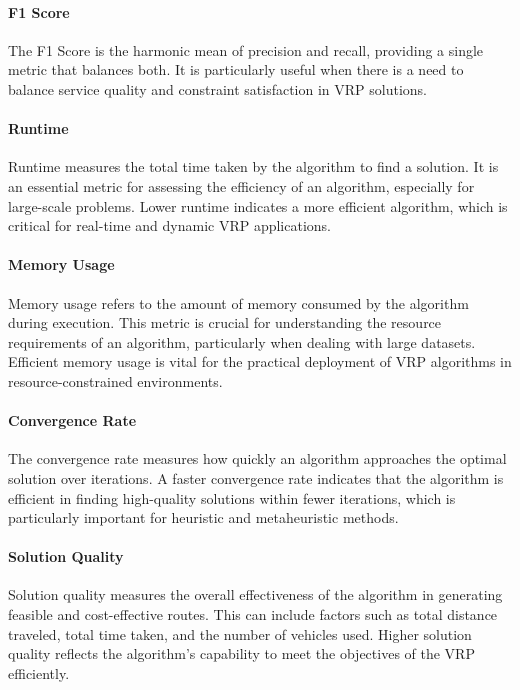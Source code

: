 \documentclass[
]{article}
\begin{document}
  \paragraph{F1 Score} The F1 Score is the harmonic mean of precision and recall, providing a single metric that balances both. It is particularly useful when there is a need to balance service quality and constraint satisfaction in VRP solutions.
  
  \paragraph{Runtime} Runtime measures the total time taken by the algorithm to find a solution. It is an essential metric for assessing the efficiency of an algorithm, especially for large-scale problems. Lower runtime indicates a more efficient algorithm, which is critical for real-time and dynamic VRP applications.
  
  \paragraph{Memory Usage} Memory usage refers to the amount of memory consumed by the algorithm during execution. This metric is crucial for understanding the resource requirements of an algorithm, particularly when dealing with large datasets. Efficient memory usage is vital for the practical deployment of VRP algorithms in resource-constrained environments.
  
  \paragraph{Convergence Rate} The convergence rate measures how quickly an algorithm approaches the optimal solution over iterations. A faster convergence rate indicates that the algorithm is efficient in finding high-quality solutions within fewer iterations, which is particularly important for heuristic and metaheuristic methods.
  
  \paragraph{Solution Quality} Solution quality measures the overall effectiveness of the algorithm in generating feasible and cost-effective routes. This can include factors such as total distance traveled, total time taken, and the number of vehicles used. Higher solution quality reflects the algorithm’s capability to meet the objectives of the VRP efficiently.
  
\end{document}
